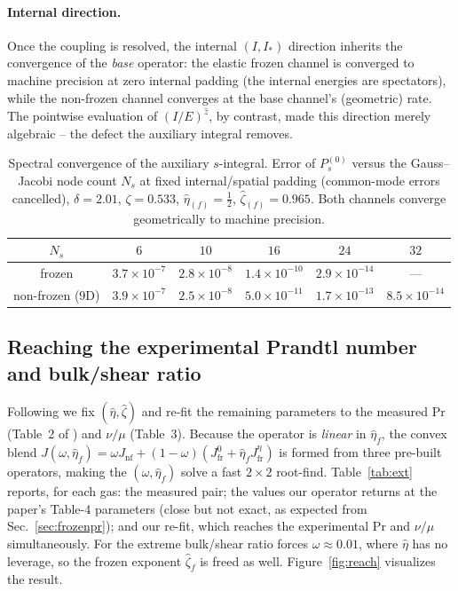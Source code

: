 \documentclass[11pt]{article}
\newcommand{\etah}{\hat{\eta}}
\newcommand{\zetah}{\hat{\zeta}}
\renewcommand{\Pr}{\mathrm{Pr}}
\begin{document}
\paragraph{Internal direction.}
Once the coupling is resolved, the internal $(I,I_*)$ direction inherits the convergence of the
\emph{base} operator: the elastic frozen channel is converged to machine precision at zero internal
padding (the internal energies are spectators), while the non-frozen channel converges at the base
channel's (geometric) rate. The pointwise evaluation of $(I/E)^{\hat z}$, by contrast, made this
direction merely algebraic -- the defect the auxiliary integral removes.

\begin{table}[t]
\centering
\caption{Spectral convergence of the auxiliary $s$-integral. Error of $P_s^{(0)}$ versus the
Gauss--Jacobi node count $N_s$ at fixed internal/spatial padding (common-mode errors cancelled),
$\delta=2.01$, $\zeta=0.533$, $\hat\eta_{(f)}=\tfrac12$, $\hat\zeta_{(f)}=0.965$. Both channels
converge geometrically to machine precision.}
\label{tab:saxis}
\begin{tabular}{cccccc}
\toprule
$N_s$ & $6$ & $10$ & $16$ & $24$ & $32$ \\
\midrule
frozen            & $3.7\times10^{-7}$ & $2.8\times10^{-8}$ & $1.4\times10^{-10}$ & $2.9\times10^{-14}$ & --- \\
non-frozen (9D)   & $3.9\times10^{-7}$ & $2.5\times10^{-8}$ & $5.0\times10^{-11}$ & $1.7\times10^{-13}$ & $8.5\times10^{-14}$ \\
\bottomrule
\end{tabular}
\end{table}

\subsection{Reaching the experimental Prandtl number and bulk/shear ratio}
Following \cite{Djordjic2023} we fix $(\etah,\zetah)$ and re-fit the remaining parameters to the
measured $\Pr$ (Table~2 of \cite{Djordjic2023}) and $\nu/\mu$ (Table~3). Because the operator is
\emph{linear} in $\etah_f$, the convex blend
$J(\omega,\etah_f)=\omega J_{\mathrm{nf}}+(1-\omega)(J_{\mathrm{fr}}^{0}+\etah_f J_{\mathrm{fr}}^{\eta})$
is formed from three pre-built operators, making the $(\omega,\etah_f)$ solve a fast $2\times2$
root-find. Table~\ref{tab:ext} reports, for each gas: the measured pair; the values our operator
returns at the paper's Table-4 parameters (close but not exact, as expected from
Sec.~\ref{sec:frozenpr}); and our re-fit, which reaches the experimental $\Pr$ and $\nu/\mu$
simultaneously. For  the extreme bulk/shear ratio forces $\omega\!\approx\!0.01$, where
$\etah$ has no leverage, so the frozen exponent $\zetah_f$ is freed as well.
Figure~\ref{fig:reach} visualizes the result.
\end{document}
